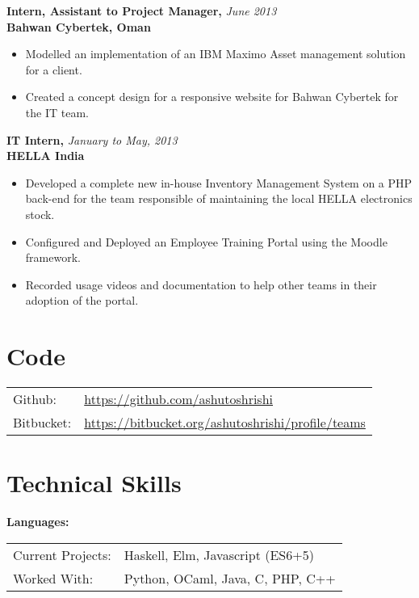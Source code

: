 \documentclass[a4paper,overlapped]{res}
\begin{document}
\begin{resume}
  \textbf{Intern, Assistant to Project Manager,}  \hfill \textit{June 2013}\\
  \textbf{Bahwan Cybertek, Oman}
  \begin{itemize}
  \item Modelled an implementation of an IBM Maximo Asset management 
    solution for a client. 
  \item Created a concept design for a responsive website for Bahwan Cybertek 
    for the IT team. 
  \end{itemize}

  \textbf{IT Intern,} \hfill \textit{January to May, 2013}\\
  \textbf{HELLA India}
  \begin{itemize}
  \item Developed a complete new in-house Inventory Management System on a PHP
    back-end for the team responsible of maintaining the local HELLA electronics stock.
  \item Configured and Deployed an Employee Training Portal using the
    Moodle framework.
  \item Recorded usage videos and documentation to help other teams in their
    adoption of the portal.
  \end{itemize}


  \section{Code}
  \begin{tabular}{l l}
    Github:    & \url{https://github.com/ashutoshrishi} \\
    Bitbucket: & \url{https://bitbucket.org/ashutoshrishi/profile/teams}
  \end{tabular}
  

  \section{Technical Skills} 
  \textbf{Languages:} \\ 
  \begin{tabular}{l l}
    Current Projects: & Haskell, Elm, Javascript (ES6+5) \\ 
    Worked With: & Python, OCaml, Java, C, PHP, C++ \\
  \end{tabular}


\end{resume}
\end{document}
